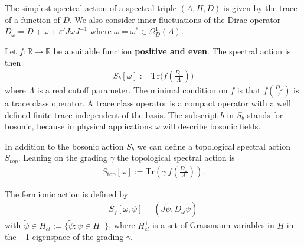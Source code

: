 The simplest spectral action of a spectral triple $(A, H, D)$ is given by the
trace of a function of $D$. We also consider inner fluctuations of the Dirac
operator $D_\omega = D + \omega + \varepsilon' J\omega J^{-1}$ where $\omega =
\omega ^* \in \Omega_D^1(A)$.
\begin{definition}
    Let $f:\mathbb{R} \rightarrow \mathbb{R}$ be a suitable function
    \textbf{positive and even}. The spectral action is then
    \begin{align}
        S_b [\omega] := \text{Tr}\big(f(\frac{D_\omega}{\Lambda})\big)
    \end{align}
    where $\Lambda$ is a real cutoff parameter. The minimal condition on $f$
    is that $f(\frac{D_\omega}{\Lambda})$ is  a trace class operator. A trace
    class operator is a compact operator with a well defined finite trace
    independent of the basis. The subscript $b$ in $S_b$ stands for bosonic,
    because in physical applications $\omega$ will describe bosonic fields.

    In addition to the bosonic action $S_b$ we can define a topological spectral
    action $S_{top}$. Leaning on the grading $\gamma$ the topological spectral action is
    \begin{align}
        S_{\text{top}}[\omega] := \text{Tr}(\gamma\
        f(\frac{D_\omega}{\Lambda})).
    \end{align}
\end{definition}
\begin{definition}\label{def:fermionic action}
    The fermionic action is defined by
    \begin{align}
        S_f[\omega, \psi] = (J\tilde{\psi}, D_\omega \tilde{\psi})
    \end{align}
    with $\tilde{\psi} \in H_{cl}^+ := \{\tilde{\psi}: \psi \in H^+\}$, where
    $H_{cl}^+$ is a set of Grassmann variables in $H$ in the +1-eigenspace
    of the grading $\gamma$.
\end{definition}

